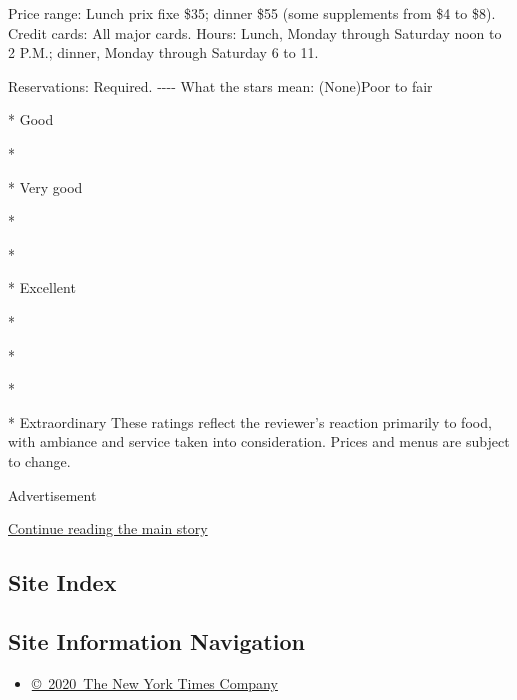 Price range: Lunch prix fixe \$35; dinner \$55 (some supplements from
\$4 to \$8). Credit cards: All major cards. Hours: Lunch, Monday through
Saturday noon to 2 P.M.; dinner, Monday through Saturday 6 to 11.

Reservations: Required. -\/-\/-\/- What the stars mean: (None)Poor to
fair

* Good

*

* Very good

*

*

* Excellent

*

*

*

* Extraordinary These ratings reflect the reviewer's reaction primarily
to food, with ambiance and service taken into consideration. Prices and
menus are subject to change.

Advertisement

\protect\hyperlink{after-bottom}{Continue reading the main story}

\hypertarget{site-index}{%
\subsection{Site Index}\label{site-index}}

\hypertarget{site-information-navigation}{%
\subsection{Site Information
Navigation}\label{site-information-navigation}}

\begin{itemize}
\tightlist
\item
  \href{https://help.nytimes3xbfgragh.onion/hc/en-us/articles/115014792127-Copyright-notice}{©~2020~The
  New York Times Company}
\end{itemize}

